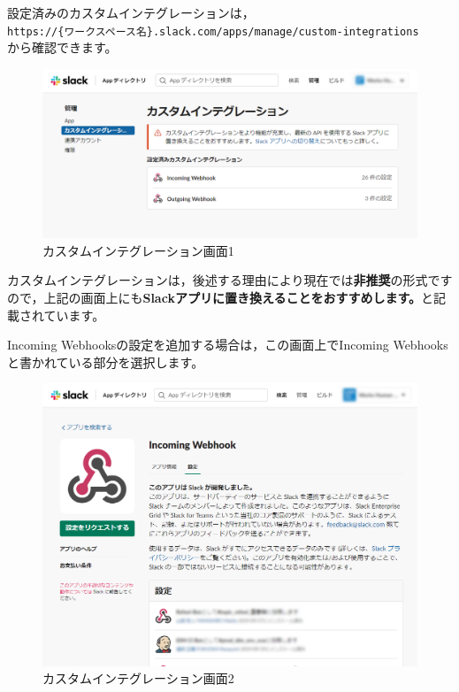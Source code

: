 \documentclass[uplatex,a4j]{jsarticle}
\begin{document}
設定済みのカスタムインテグレーションは，\\
\verb|https://{ワークスペース名}.slack.com/apps/manage/custom-integrations|\\
から確認できます。

\begin{figure}[h]
 \centering
 \includegraphics[keepaspectratio, scale=0.6]{images/custom_integration1.png}
 \caption{カスタムインテグレーション画面1}
 \label{fig:custom_integration1}
\end{figure}

カスタムインテグレーションは，後述する理由により現在では\textbf{非推奨}の形式ですので，上記の画面上にも\textbf{Slackアプリに置き換えることをおすすめします。}と記載されています。


Incoming Webhooksの設定を追加する場合は，この画面上でIncoming Webhooksと書かれている部分を選択します。

\begin{figure}[h]
 \centering
 \includegraphics[keepaspectratio, scale=0.6]{images/custom_integration2.png}
 \caption{カスタムインテグレーション画面2}
 \label{fig:custom_integration2}
\end{figure}
\end{document}
